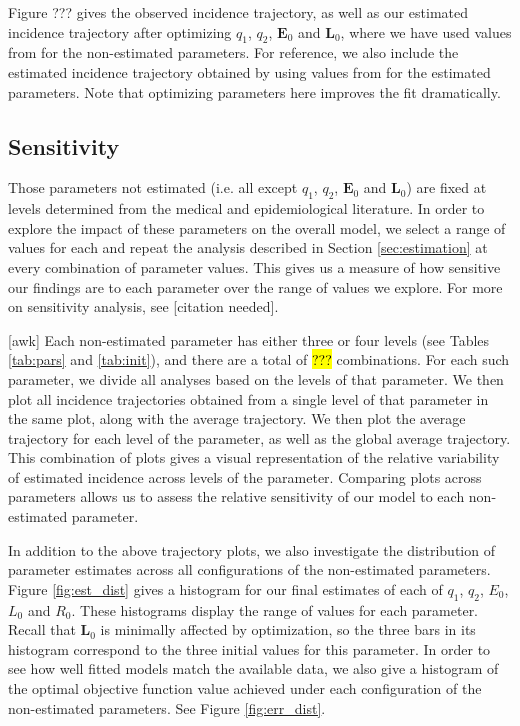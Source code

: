 \documentclass[sn-mathphys,Numbered]{sn-jnl}%
\newcommand{\cE}{\mathbf{E}}
\newcommand{\cL}{\mathbf{L}}
\theoremstyle{thmstyleone}%
\theoremstyle{thmstyletwo}%
\theoremstyle{thmstylethree}%
\begin{document}
Figure ??? gives the observed incidence trajectory, as well as our estimated incidence trajectory after optimizing $q_1$, $q_2$, $\cE_0$ and $\cL_0$, where we have used values from \citet{Guo2011PersistentLatency} for the non-estimated parameters. For reference, we also include the estimated incidence trajectory obtained by using values from \citet{Guo2011PersistentLatency} for the estimated parameters. Note that optimizing parameters here improves the fit dramatically.


\subsection{Sensitivity}

Those parameters not estimated (i.e. all except $q_1$, $q_2$, $\cE_0$ and $\cL_0$) are fixed at levels determined from the medical and epidemiological literature. In order to explore the impact of these parameters on the overall model, we select a range of values for each and repeat the analysis described in Section \ref{sec:estimation} at every combination of parameter values. This gives us a measure of how sensitive our findings are to each parameter over the range of values we explore. For more on sensitivity analysis, see [citation needed]. 

[awk] Each non-estimated parameter has either three or four levels (see Tables \ref{tab:pars} and \ref{tab:init}), and there are a total of \hl{???} combinations. For each such parameter, we divide all analyses based on the levels of that parameter. We then plot all incidence trajectories obtained from a single level of that parameter in the same plot, along with the average trajectory. We then plot the average trajectory for each level of the parameter, as well as the global average trajectory. This combination of plots gives a visual representation of the relative variability of estimated incidence across levels of the parameter. Comparing plots across parameters allows us to assess the relative sensitivity of our model to each non-estimated parameter.

In addition to the above trajectory plots, we also investigate the distribution of parameter estimates across all configurations of the non-estimated parameters. Figure \ref{fig:est_dist} gives a histogram for our final estimates of each of $q_1$, $q_2$, $E_0$, $L_0$ and $R_0$. These histograms display the range of values for each parameter. Recall that $\cL_0$ is minimally affected by optimization, so the three bars in its histogram correspond to the three initial values for this parameter. In order to see how well fitted models match the available data, we also give a histogram of the optimal objective function value achieved under each configuration of the non-estimated parameters. See Figure \ref{fig:err_dist}.
\end{document}
